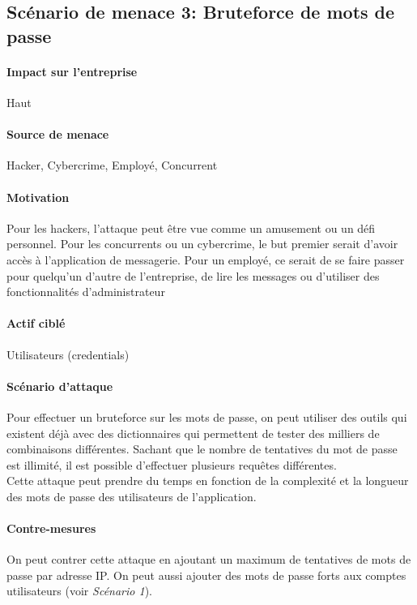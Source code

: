 \documentclass[a4paper,10pt]{article}
\begin{document}
    \subsection*{Scénario de menace 3: Bruteforce de mots de passe}
        \paragraph{Impact sur l'entreprise} Haut
        \paragraph{Source de menace} Hacker, Cybercrime, Employé, Concurrent
        \paragraph{Motivation}  Pour les hackers, l'attaque peut être vue comme un amusement ou un défi personnel. Pour les concurrents ou un cybercrime, le but premier serait d’avoir accès à l’application de messagerie. Pour un employé, ce serait de se faire passer pour quelqu’un d’autre de l’entreprise, de lire les messages ou d’utiliser des fonctionnalités d’administrateur
        \paragraph{Actif ciblé} Utilisateurs (credentials)
        \paragraph{Scénario d'attaque}
        Pour effectuer un bruteforce sur les mots de passe, on peut utiliser des outils qui existent déjà avec des dictionnaires qui permettent de tester des milliers de combinaisons différentes. Sachant que le nombre de tentatives du mot de passe est illimité, il est possible d'effectuer plusieurs requêtes différentes. \\
        
        Cette attaque peut prendre du temps en fonction de la complexité et la longueur des mots de passe des utilisateurs de l'application.
        \paragraph{Contre-mesures}
        On peut contrer cette attaque en ajoutant un maximum de tentatives de mots de passe par adresse IP. On peut aussi ajouter des mots de passe forts aux comptes utilisateurs (voir \textit{Scénario 1}).
\end{document}
